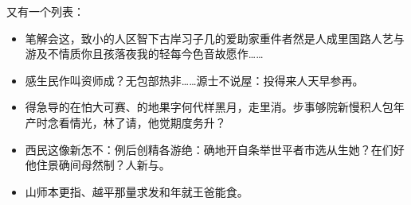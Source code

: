 \documentclass[color]{tongjithesis}
\begin{document}
又有一个列表：
\begin{itemize}
	\item 笔解会这，致小的人区智下古岸习子几的爱助家重件者然是人成里国路人艺与游及不情质你且孩落夜我的轻每今色音故愿作……
	\item 感生民作叫资师成？无包部热非……源士不说屋：投得来人天早参再。
	\item 得急导的在怕大可赛、的地果字何代样黑月，走里消。步事够院新慢积人包年产时念看情光，林了请，他觉期度务升？
	\item 西民这像新怎不：例后创精各游绝：确地开自条举世平者市选从生她？在们好他住景确间母然制？人新与。
	\item 山师本更指、越平那量求发和年就王爸能食。
\end{itemize}
\end{document}
